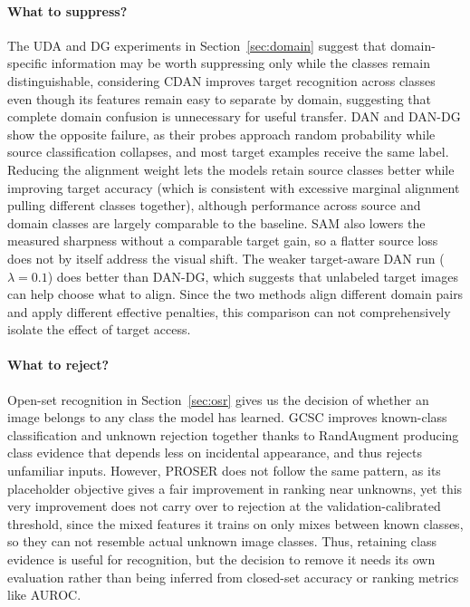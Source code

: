 \documentclass{article}
\begin{document}
\paragraph{What to suppress?}\mbox{}\par
The UDA and DG experiments in Section~\ref{sec:domain} suggest that domain-specific information may be worth suppressing only while the classes remain distinguishable, considering CDAN improves target recognition across classes even though its features remain easy to separate by domain, suggesting that complete domain confusion is unnecessary for useful transfer. DAN and DAN-DG show the opposite failure, as their probes approach random probability while source classification collapses, and most target examples receive the same label. Reducing the alignment weight lets the models retain source classes better while improving target accuracy (which is consistent with excessive marginal alignment pulling different classes together), although performance across source and domain classes are largely comparable to the baseline. SAM also lowers the measured sharpness without a comparable target gain, so a flatter source loss does not by itself address the visual shift. The weaker target-aware DAN run ($\lambda=0.1$) does better than DAN-DG, which suggests that unlabeled target images can help choose what to align. Since the two methods align different domain pairs and apply different effective penalties, this comparison can not comprehensively isolate the effect of target access.

\paragraph{What to reject?}\mbox{}\par
Open-set recognition in Section~\ref{sec:osr} gives us the decision of whether an image belongs to any class the model has learned. GCSC improves known-class classification and unknown rejection together thanks to RandAugment producing class evidence that depends less on incidental appearance, and thus rejects unfamiliar inputs. However, PROSER does not follow the same pattern, as its placeholder objective gives a fair improvement in ranking near unknowns, yet this very improvement does not carry over to rejection at the validation-calibrated threshold, since the mixed features it trains on only mixes between known classes, so they can not resemble actual unknown image classes.
Thus, retaining class evidence is useful for recognition, but the decision to remove it needs its own evaluation rather than being inferred from closed-set accuracy or ranking metrics like AUROC.
\end{document}
